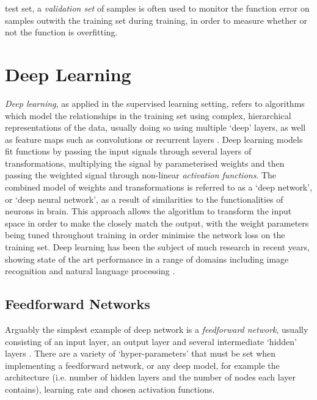 test set, a \textit{validation set} of samples is often used to monitor the function error on samples outwith the training set during training, in order to measure whether or not the function is overfitting. 

\section{Deep Learning}
\textit{Deep learning}, as applied in the supervised learning setting, refers to algorithms which model the relationships in the training set using complex, hierarchical representations of the data, usually doing so using multiple `deep' layers, as well as feature maps such as convolutions or recurrent layers \cite{lecun2015deep}. Deep learning models fit functions by passing the input signals through several layers of transformations, multiplying the signal by parameterised weights and then passing the weighted signal through non-linear \textit{activation functions}. The combined model of weights and transformations is referred to as a `deep network', or `deep neural network', as a result of similarities to the functionalities of neurons in brain. This approach allows the algorithm to transform the input space in order to make the closely match the output, with the weight parameters being tuned throughout training in order minimise the network loss on the training set. Deep learning has been the subject of much research in recent years, showing state of the art performance in a range of domains including image recognition and natural language processing \cite{lecun2015deep} \cite{bengio2012practical}.
\subsection{Feedforward Networks}
Arguably the simplest example of deep network is a \textit{feedforward network}, usually consisting of an input layer, an output layer and several intermediate `hidden' layers \cite{Witten2011}. There are a variety of `hyper-parameters' that must be set when implementing a feedforward network, or any deep model, for example the architecture (i.e. number of hidden layers and the number of nodes each layer contains), learning rate and chosen activation functions.

